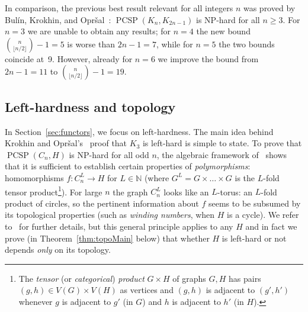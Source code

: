 \documentclass[11pt,a4paper]{scrartcl}
\numberwithin{theorem}{section}
\theoremstyle{definition}
\newcommand{\NN}{\mathbb{N}}
\DeclareMathOperator{\PCSP}{PCSP}
\newcommand\B[1]{{\textstyle\binom{#1}{\lfloor #1/2 \rfloor}}}
\begin{document}
In comparison, the previous best result relevant for all integers $n$ was proved
by Bul\'in, Krokhin, and Opr\v{s}al~\cite{BulinKO18}: $\PCSP(K_n, K_{2n-1})$ is NP-hard for all $n\geq 3$.
For $n=3$ we are unable to obtain any results; for $n=4$ the new bound $\B{n}-1=5$ is worse than $2n-1=7$, while for $n=5$ the two bounds coincide at~9.
However, already for $n=6$ we improve the bound from $2n-1=11$ to $\B{n}-1=19$.

\subsection{Left-hardness and topology}

In Section~\ref{sec:functors}, we focus on left-hardness.
The main idea behind Krokhin and Opr\v{s}al's~\cite{KrokhinO19} proof that $K_3$ is left-hard is simple to state.
To prove that $\PCSP(C_n,H)$ is NP-hard for all odd $n$, the algebraic framework of~\cite{BulinKO18} shows that it is sufficient to establish certain properties of \emph{polymorphisms}: homomorphisms $f \colon C_n^{L} \to H$ for $L \in \NN$ (where $G^L=G \times \dots \times G$ is the $L$-fold tensor product\footnote{
	The \emph{tensor} (or \emph{categorical}) \emph{product} $G \times H$ of graphs $G,H$ has pairs $(g,h) \in V(G) \times V(H)$ as vertices and
  $(g,h)$ is adjacent to $(g',h')$ whenever $g$ is adjacent to $g'$ (in $G$) and
  $h$ is adjacent to $h'$ (in $H$).
}).
For large $n$ the graph $C_n^{L}$ looks like an $L$-torus: an $L$-fold product of circles, so the pertinent information about $f$ seems to be subsumed by its topological properties (such as \emph{winding numbers}, when $H$ is a cycle).
We refer to~\cite{KrokhinO19} for further details, but this general principle
applies to any $H$ and in fact we prove (in Theorem~\ref{thm:topoMain} below)
that whether $H$ is left-hard or not depends \emph{only} on its topology.
\end{document}
